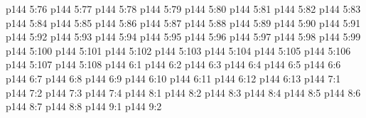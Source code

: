 \vs p144 5:76 
\vs p144 5:77 
\vs p144 5:78 
\vs p144 5:79 
\vs p144 5:80 
\vs p144 5:81 
\vs p144 5:82 
\vs p144 5:83 
\vs p144 5:84 
\vs p144 5:85 
\vs p144 5:86 
\vs p144 5:87 
\vs p144 5:88 
\vs p144 5:89 
\vs p144 5:90 
\vs p144 5:91 
\vs p144 5:92 
\vs p144 5:93 
\vs p144 5:94 
\vs p144 5:95 
\vs p144 5:96 
\vs p144 5:97 
\vs p144 5:98 
\vs p144 5:99 
\vs p144 5:100 
\vs p144 5:101 
\vs p144 5:102 
\vs p144 5:103 
\vs p144 5:104 
\vs p144 5:105 
\vs p144 5:106 
\vs p144 5:107 
\vspace*{1ex}
\vs p144 5:108 
\vs p144 6:1 
\vs p144 6:2 
\vs p144 6:3 
\vs p144 6:4 
\vs p144 6:5 \pc 
\vs p144 6:6 
\vs p144 6:7 
\vs p144 6:8 
\vs p144 6:9 
\vs p144 6:10 \pc 
\vs p144 6:11 
\vs p144 6:12 \pc 
\vs p144 6:13 \pc 
{}
\vs p144 7:1 
\vs p144 7:2 
\vs p144 7:3 
\vs p144 7:4 
\vs p144 8:1 
\vs p144 8:2 
\vs p144 8:3 
\vs p144 8:4 
\vs p144 8:5 
\vs p144 8:6 
\vs p144 8:7 
\vs p144 8:8 
\vs p144 9:1 
\vs p144 9:2 
\quizlink
